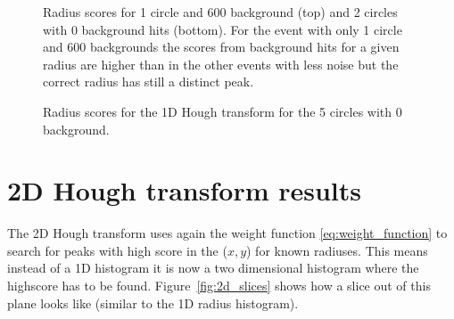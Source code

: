 \documentclass[11pt]{scrreprt}
\begin{document}
\begin{figure}[htp]
        \centering

                \label{fig:2c0bg_radius1}%
                \label{fig:2c0b_radius2}
                \caption[1D Radius scores for two events]{Radius scores for 1 circle and 600 background (top) and 2 circles with 0 background hits (bottom). For the event
                with only 1 circle and 600 backgrounds the scores from background hits for a given radius are higher than in the other
                events with less noise but the correct radius has still a distinct peak.}
                \label{fig:1_2_c_radius}
\end{figure}
\begin{figure}[htb]
\centering
  

        \caption{Radius scores for the 1D Hough transform for the 5 circles with 0 background.}\label{fig:1d_ht_radius}
\end{figure}




\clearpage
\section{2D Hough transform results} %
\label{sec:2d_hough_transform_results}
The 2D Hough transform uses again the weight function \ref{eq:weight_function} to search for peaks with high
score in the ($x,y$) for known radiuses. This means instead of a 1D histogram it is now a two dimensional histogram 
where the highscore has to be found. Figure~\ref{fig:2d_slices} shows how a slice out of this plane looks like 
(similar to the 1D radius histogram).
\end{document}
